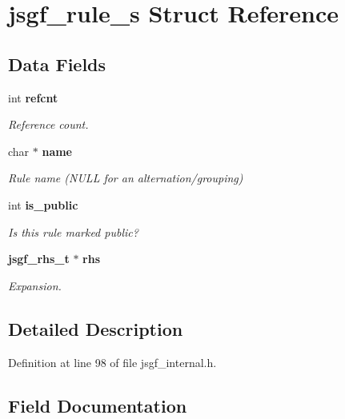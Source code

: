 \section{jsgf\+\_\+rule\+\_\+s Struct Reference}
\label{structjsgf__rule__s}
\subsection*{Data Fields}
\begin{DoxyCompactItemize}
\item 
int {\bf refcnt}
\begin{DoxyCompactList}\small\item\em Reference count. \end{DoxyCompactList}\item 
char $\ast$ {\bf name}\label{structjsgf__rule__s_a1b1de5afa4c0f27df4e8d51ebc47ca92}

\begin{DoxyCompactList}\small\item\em Rule name (N\+U\+L\+L for an alternation/grouping) \end{DoxyCompactList}\item 
int {\bf is\+\_\+public}\label{structjsgf__rule__s_a36478d9850594d6a201c6724ec1f1fa4}

\begin{DoxyCompactList}\small\item\em Is this rule marked \textquotesingle{}public\textquotesingle{}? \end{DoxyCompactList}\item 
{\bf jsgf\+\_\+rhs\+\_\+t} $\ast$ {\bf rhs}\label{structjsgf__rule__s_a6923b74ad72f8b663cc00dfa99490981}

\begin{DoxyCompactList}\small\item\em Expansion. \end{DoxyCompactList}\end{DoxyCompactItemize}


\subsection{Detailed Description}


Definition at line 98 of file jsgf\+\_\+internal.\+h.



\subsection{Field Documentation}
